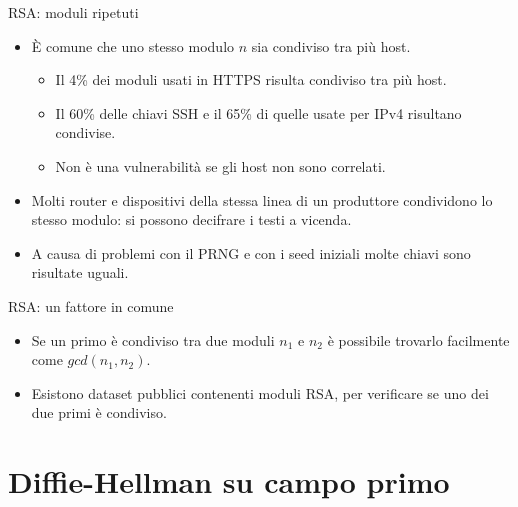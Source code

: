 \documentclass[11pt,svgnames,smaller,aspectratio=169,italian]{beamer}
\begin{document}
\begin{frame}{RSA: moduli ripetuti}
	\begin{itemize}
		\item È comune che uno stesso modulo $n$ sia condiviso tra più host.
			\begin{itemize}
				\item Il 4\% dei moduli usati in HTTPS risulta condiviso tra più host.
				\item Il 60\% delle chiavi SSH e il 65\% di quelle usate per IPv4 risultano condivise.
				\item Non è una vulnerabilità se gli host non sono correlati.
			\end{itemize}
		\item Molti router e dispositivi della stessa linea di un produttore condividono lo stesso modulo: si possono decifrare i testi a vicenda.
		\item A causa di problemi con il PRNG e con i seed iniziali molte chiavi sono risultate uguali.
	\end{itemize}
\end{frame}


\begin{frame}{RSA: un fattore in comune}
	\begin{itemize}
		\item Se un primo è condiviso tra due moduli $n_{1}$ e $n_{2}$ è possibile trovarlo facilmente come $gcd(n_{1}, n_{2})$.
		\item Esistono dataset pubblici contenenti moduli RSA, per verificare se uno dei due primi è condiviso.
	\end{itemize}
\end{frame}

\section{Diffie-Hellman su campo primo}
\begin{frame}
	\sectionpage
	\centering
\end{frame}
\end{document}
